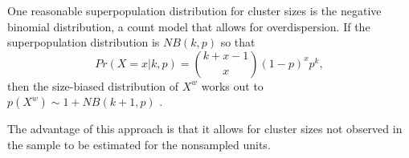 \documentclass[12pt,a4paper]{article}
\begin{document}
One reasonable superpopulation distribution for cluster sizes is the negative binomial distribution, a count model that allows for overdispersion. If the superpopulation distribution is $NB(k, p)$ so that
\[
	Pr(X=x|k,p) = {k + x - 1 \choose x} (1-p)^x p^k,
\]
then the size-biased distribution of $X^w$ works out to $p(X^w) \sim 1 + NB(k+1, p)$ \citep{pr1978}.

The advantage of this approach is that it allows for cluster sizes not observed in the sample to be estimated for the nonsampled units.



{\footnotesize

}
\end{document}
